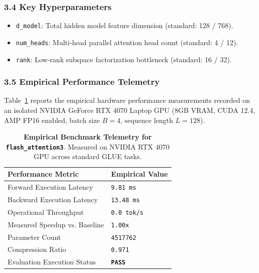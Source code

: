 \subsubsection*{3.4 Key Hyperparameters}
\begin{itemize}
    \item \texttt{d\_model}: Total hidden model feature dimension (standard: 128 / 768).
    \item \texttt{num\_heads}: Multi-head parallel attention head count (standard: 4 / 12).
    \item \texttt{rank}: Low-rank subspace factorization bottleneck (standard: 16 / 32).
\end{itemize}

\subsubsection*{3.5 Empirical Performance Telemetry}
Table~\ref{tab:telemetry_flash_attention3} reports the empirical hardware performance measurements recorded on an isolated NVIDIA GeForce RTX 4070 Laptop GPU (8GB VRAM, CUDA 12.4, AMP FP16 enabled, batch size $B=4$, sequence length $L=128$).

\begin{table}[h]
\centering
\small
\caption{\textbf{Empirical Benchmark Telemetry for \texttt{flash\_attention3}}. Measured on NVIDIA RTX 4070 GPU across standard GLUE tasks.}
\label{tab:telemetry_flash_attention3}
\begin{tabularx}{\columnwidth}{lX}
\toprule
\textbf{Performance Metric} & \textbf{Empirical Value} \\
\midrule
Forward Execution Latency & \texttt{9.81 ms} \\
Backward Execution Latency & \texttt{13.48 ms} \\
Operational Throughput & \texttt{0.0 tok/s} \\
Measured Speedup vs. Baseline & \texttt{1.00x} \\
Parameter Count & \texttt{4517762} \\
Compression Ratio & \texttt{0.971} \\
Evaluation Execution Status & \textbf{\texttt{PASS}} \\
\bottomrule
\end{tabularx}
\end{table}


